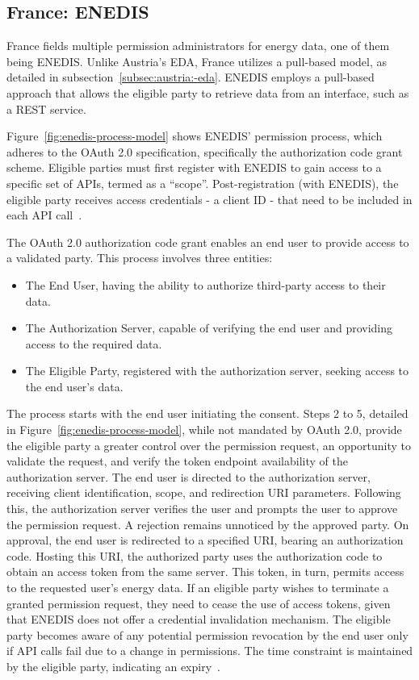 \subsection{France: ENEDIS}\label{subsec:france:-enedis}
France fields multiple permission administrators for energy data, one of them being ENEDIS.
Unlike Austria's EDA, France utilizes a pull-based model, as detailed in subsection\ \ref{subsec:austria:-eda}.
ENEDIS employs a pull-based approach that allows the eligible party to retrieve data from an interface,
such as a REST service.

Figure\ \ref{fig:enedis-process-model} shows ENEDIS' permission process,
which adheres to the OAuth 2.0 specification, specifically the authorization code grant scheme.
Eligible parties must first register with ENEDIS to gain access to a specific set of APIs, termed as a ``scope''.
Post-registration (with ENEDIS), the eligible party receives access credentials - a client ID -
that need to be included in each API call~\cite{rfc6749-oauth, enedis-dev-guide}.

The OAuth 2.0 authorization code grant enables an end user to provide access to a validated party.
This process involves three entities:
\begin{itemize}
    \item{The End User}, having the ability to authorize third-party access to their data.
    \item{The Authorization Server}, capable of verifying the end user and providing access to the required data.
    \item{The Eligible Party}, registered with the authorization server, seeking access to the end user's data.
\end{itemize}

The process starts with the end user initiating the consent.
Steps 2 to 5, detailed in Figure\ \ref{fig:enedis-process-model}, while not mandated by OAuth 2.0,
provide the eligible party a greater control over the permission request, an opportunity to validate the request,
and verify the token endpoint availability of the authorization server.
The end user is directed to the authorization server,
receiving client identification, scope, and redirection URI parameters.
Following this, the authorization server verifies the user and prompts the user to approve the permission request.
A rejection remains unnoticed by the approved party.
On approval, the end user is redirected to a specified URI, bearing an authorization code.
Hosting this URI, the authorized party uses the authorization code to obtain an access token from the same server.
This token, in turn, permits access to the requested user's energy data.
If an eligible party wishes to terminate a granted permission request,
they need to cease the use of access tokens, given that ENEDIS does not offer a credential invalidation mechanism.
The eligible party becomes aware of any potential permission revocation by the end user
only if API calls fail due to a change in permissions.
The time constraint is maintained by the eligible party, indicating an expiry~\cite{enedis-dev-guide,rfc6749-oauth}.

